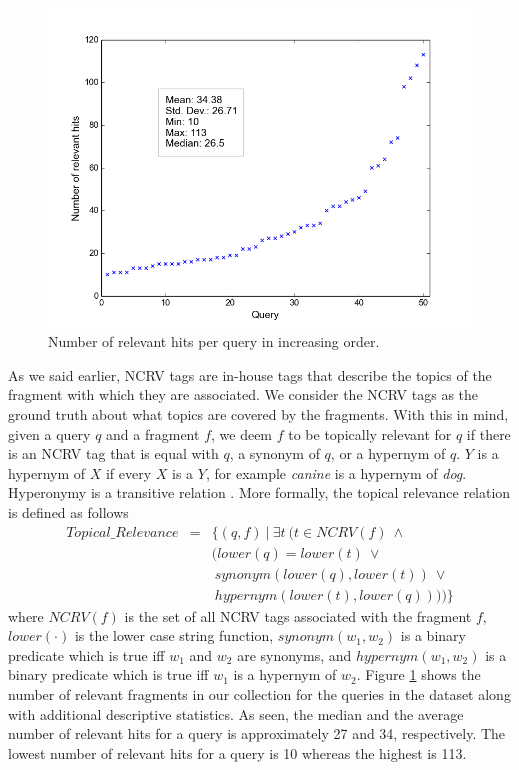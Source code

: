 \begin{figure}
\centering
\includegraphics[scale=.4]{reljud.png}
\caption{Number of relevant hits per query in increasing order.}
\label{filter:fig:reljud}
\end{figure}
As we said earlier, %
NCRV tags are in-house tags that describe the topics of the fragment with which they are associated. We consider the NCRV tags as the ground truth about what topics are covered by the fragments.
With this in mind, given a query $q$ and a fragment $f$, we deem $f$ to be topically relevant for $q$ if there is an NCRV tag that is equal with $q$, a synonym of $q$, or a hypernym of $q$. $Y$ is a hypernym of $X$ if every $X$ is a $Y$, for example \textit{canine} is a hypernym of \textit{dog}. Hyperonymy is a transitive relation \cite{wordnet}. More formally, the topical relevance relation is defined as follows
\begin{eqnarray}
Topical\_Relevance &=& \{(q,f)~|~\exists t~(t \in NCRV(f)~\wedge \nonumber\\ 
				  &&(lower(q) = lower(t)~\vee \nonumber\\
				  &&~synonym(lower(q), lower(t))~\vee \nonumber\\
				  &&~hypernym(lower(t), lower(q))))\}
				  \label{top_rel_def}
\end{eqnarray}
where $NCRV(f)$ is the set of all NCRV tags associated with the fragment $f$, $lower(\cdot)$ is the lower case string function, $synonym(w_1, w_2)$ is a binary predicate which is true iff $w_1$ and $w_2$ are synonyms, and $hypernym(w_1, w_2)$ is a binary predicate which is true iff $w_1$ is a hypernym of $w_2$. Figure \ref{filter:fig:reljud} shows the number of relevant fragments in our collection for the queries in the dataset along with additional descriptive statistics. As seen, the median and the average number of relevant hits for a query is approximately 27 and 34, respectively. The lowest number of relevant hits for a query is 10 whereas the highest is 113.

